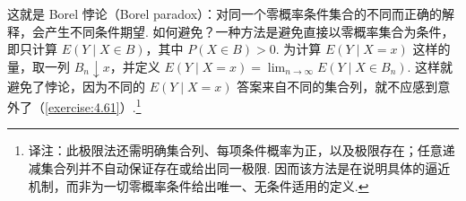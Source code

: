 这就是 Borel 悖论（Borel paradox）：对同一个零概率条件集合的不同而正确的解释，会产生不同条件期望. 如何避免？一种方法是避免直接以零概率集合为条件，即只计算 $E(Y\mid X\in B)$，其中 $P(X\in B)>0$. 为计算 $E(Y\mid X=x)$ 这样的量，取一列 $B_n\downarrow x$，并定义 $E(Y\mid X=x)=\lim_{n\to\infty}E(Y\mid X\in B_n)$. 这样就避免了悖论，因为不同的 $E(Y\mid X=x)$ 答案来自不同的集合列，就不应感到意外了（\autoref{exercise:4.61}）.\footnote{译注：此极限法还需明确集合列、每项条件概率为正，以及极限存在；任意递减集合列并不自动保证存在或给出同一极限. 因而该方法是在说明具体的逼近机制，而非为一切零概率条件给出唯一、无条件适用的定义.}

